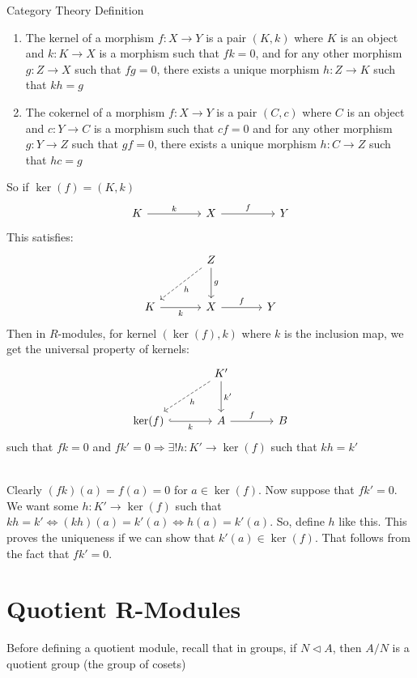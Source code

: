 \documentclass{report}
\begin{document}
\begin{definition}{Category Theory Definition}{}
\begin{enumerate}
    \item The kernel of a morphism $f: X \to Y$ is a pair $(K,k)$ where $K$ is an object and $k:K\to X$ is a morphism such that $fk=0$, and for any other morphism $g: Z \to X$ such that $fg=0$, there exists a unique morphism $h:Z \to K$ such that $kh=g$
    \item The cokernel of a morphism $f:X\to Y$ is a pair $(C,c)$ where $C$ is an object and $c:Y \to C$ is a morphism such that $cf=0$ and for any other morphism $g: Y \to Z$ such that $gf=0$, there exists a unique morphism $h:C \to Z$ such that $hc=g$
\end{enumerate}
    
\end{definition}
So if $\ker (f)=(K,k)$
\[
\begin{tikzcd}[column sep=huge, row sep=huge]
K \arrow[r, "k"] & X \arrow[r, "f"] & Y 
\end{tikzcd}
\]
This satisfies:
\[
\begin{tikzcd}[row sep=large, column sep=large]
& Z \arrow[d, "g"] \arrow[dl, dashed, "h"] \\
K  \arrow[r, "k"'] & X \arrow[r, "f"] & Y
\end{tikzcd}
\]
Then in $R$-modules, for kernel $(\ker(f), k)$ where $k$ is the inclusion map, we get the universal property of kernels:
\[
\begin{tikzcd}[row sep=large, column sep=large]
& K' \arrow[d, "k'"] \arrow[dl, dashed, "h"] \\
\ker (f)  \arrow[r, hook, "k"'] & A \arrow[r, "f"] & B
\end{tikzcd}
\]
such that $fk=0$ and $fk'=0 \Rightarrow \exists !h:K' \to \ker (f)$ such that $kh=k'$

\begin{prf}{}{}\\
    Clearly $(fk)(a) = f(a)=0$ for $a\in \ker (f)$. Now suppose that $fk'=0$. We want some $h:K' \to \ker (f)$ such that $kh=k' \iff (kh)(a)=k'(a) \iff h(a)=k'(a)$. So, define $h$ like this. This proves the uniqueness if we can show that $k'(a) \in \ker (f)$. That follows from the fact that $fk'=0$.
\end{prf}
\section{Quotient R-Modules}
Before defining a quotient module, recall that in groups, if $N \triangleleft A$, then $A/N$ is a quotient group (the group of cosets)
\end{document}
